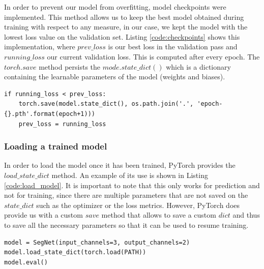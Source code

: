 In order to prevent our model from overfitting, model checkpoints were implemented. This method allows us to keep the best model obtained during training with respect to any measure, in our case, we kept the model with the lowest loss value on the validation set. Listing \ref{code:checkpoints} shows this implementation, where $prev\_loss$ is our best loss in the validation pass and $running\_loss$ our current validation loss. This is computed after every epoch. The $torch.save$ method persists the $mode.state\_dict()$ which is a dictionary containing the learnable parameters of the model (weights and biases).


\begin{lstlisting}[style=Python-color, caption=Model checkpoints, frame=single, label=code:checkpoints]
if running_loss < prev_loss:
	torch.save(model.state_dict(), os.path.join('.', 'epoch-{}.pth'.format(epoch+1)))
	prev_loss = running_loss

\end{lstlisting}

\subsubsection{Loading a trained model}
In order to load the model once it has been trained, PyTorch provides the $load\_state\_dict$ method. An example of its use is shown in Listing \ref{code:load_model}. It is important to note that this only works for prediction and not for training, since there are multiple parameters that are not saved on the $state\_dict$ such as the optimizer or the loss metrics. However, PyTorch does provide us with a custom $save$ method that allows to save a custom $dict$ and thus to save all the necessary parameters so that it can be used to resume training.

\begin{lstlisting}[style=Python-color, caption=Load model checkpoint, frame=single, label=code:load_model]
model = SegNet(input_channels=3, output_channels=2)
model.load_state_dict(torch.load(PATH))
model.eval()

\end{lstlisting}
